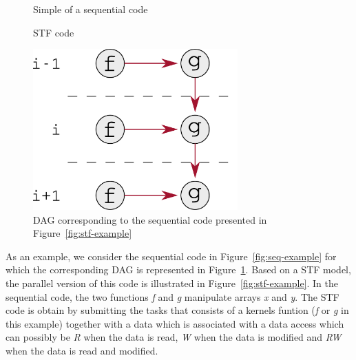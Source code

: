 \documentclass{article}
\begin{document}
\begin{figure}[!h]
  \begin{minipage}{0.5\textwidth}
    \centering {}
    
    \caption{\label{fig:seq-example}Simple of a sequential code}
    \vspace{0.5cm}
    \centering 
    \caption{\label{fig:stf-example}STF code}
  \end{minipage}
  \hspace{0.5cm}
  \begin{minipage}{0.5\textwidth}
    \centering
    \includegraphics[width=0.7\textwidth]{figures/example_dag}
    \caption{\label{fig:dag-example}DAG corresponding to the
      sequential code presented in Figure~\ref{fig:stf-example}}
  \end{minipage}
\end{figure}

As an example, we consider the sequential code in
Figure~\ref{fig:seq-example} for which the corresponding DAG is
represented in Figure~\ref{fig:dag-example}. Based on a STF model, the
parallel version of this code is illustrated in
Figure~\ref{fig:stf-example}. In the sequential code, the two
functions \textit{f} and \textit{g} manipulate arrays \textit{x} and
\textit{y}. The STF code is obtain by submitting the tasks that
consists of a kernels funtion (\textit{f} or \textit{g} in this
example) together with a data which is associated with a data access
which can possibly be \textit{R} when the data is read, \textit{W}
when the data is modified and \textit{RW} when the data is read and
modified.
\end{document}
